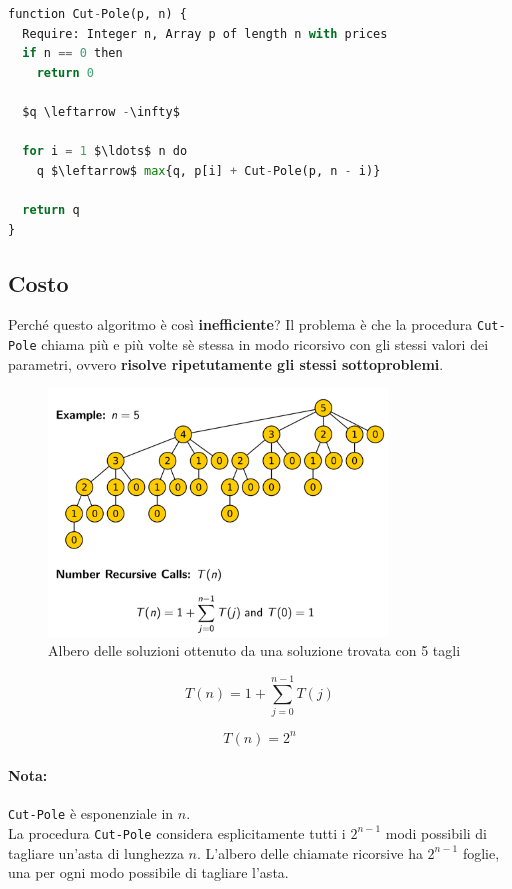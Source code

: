 \begin{lstlisting}[language=Python, mathescape=true]
function Cut-Pole(p, n) {
  Require: Integer n, Array p of length n with prices
  if n == 0 then
    return 0

  $q \leftarrow -\infty$

  for i = 1 $\ldots$ n do
    q $\leftarrow$ max{q, p[i] + Cut-Pole(p, n - i)}

  return q
}
\end{lstlisting}

\subsection{Costo}

Perché questo algoritmo è così \textbf{inefficiente}? Il problema è che
la procedura \texttt{Cut-Pole} chiama più e più volte sè stessa in modo
ricorsivo con gli stessi valori dei parametri, ovvero \textbf{risolve
  ripetutamente gli stessi sottoproblemi}.
\begin{figure}[H]
  \centering
  \includegraphics[width=9cm, keepaspectratio]{capitoli/programmazione_dinamica/imgs/pole4.png}
  \caption{Albero delle soluzioni ottenuto da una soluzione trovata con 5 tagli}
\end{figure}

$$
  T(n) = 1 + \sum^{n-1}_{j=0}T(j)
$$

$$
  T(n) = 2^n
$$

\paragraph*{Nota:} \texttt{Cut-Pole} è esponenziale in $n$.\\

La procedura \texttt{Cut-Pole} considera esplicitamente tutti i $2^{n-1}$ modi
possibili di tagliare un'asta di lunghezza $n$. L'albero delle
chiamate ricorsive ha $2^{n-1}$ foglie, una per ogni modo possibile di
tagliare l'asta.

